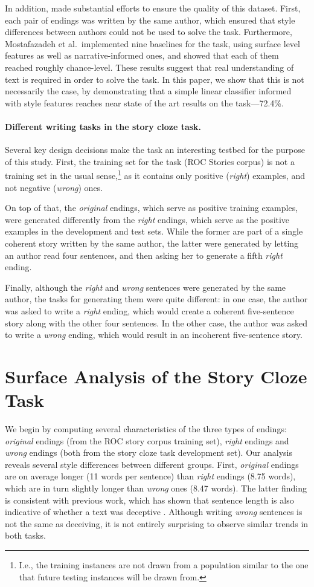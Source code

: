 \documentclass[11pt,a4paper]{article}
\newcommand{\isection}[2]{\section{#1}\label{ssec:#2}}
\begin{document}
In addition, \citet{Mostafazadeh:2016} made substantial efforts to ensure the quality of this dataset. 
First, each pair of endings was written by the same author, which
ensured that style differences between authors could not be used to solve the task. 
Furthermore, Mostafazadeh et al.~implemented nine baselines for the task, using surface level features as well as narrative-informed ones, and showed that each of them reached roughly chance-level.
These results suggest that real understanding of text is required in order to solve the task.
In this paper, we show that this is not necessarily the case, by demonstrating that a simple linear classifier informed with style features reaches near state of the art results on the task---72.4\%.

\paragraph{Different writing tasks in the story cloze task.}
Several key design decisions make the task an interesting testbed for the purpose of this study.
First, the training set for the task (ROC Stories corpus) is not a
training set in the usual sense,\footnote{I.e., the training
  instances are not drawn from a population similar to the one that future
  testing instances will be drawn from.
}  as it contains only positive ({\it right}) examples, and not negative ({\it wrong}) ones. 

On top of that, the {\it original} endings, which serve as positive training examples, were generated differently from the {\it right} endings, which serve as the positive examples in the development and test sets. 
While the former are part of a single coherent story written by the same author, the latter were generated by letting an author read four sentences, 
and then asking her to generate a fifth {\it right} ending. 

Finally, although the {\it right} and {\it wrong} sentences were generated by the same author, 
the tasks for generating them were quite different: in one case, the author was asked to write a {\it right} ending, which would create a coherent five-sentence story along with the other four sentences. In the other case, the author was asked to write a {\it wrong} ending, which would result in an incoherent five-sentence story. 

\isection{Surface Analysis of the Story Cloze Task}{Surface}
We begin by computing several characteristics of the three types of endings: {\it original} endings (from the ROC story corpus training set), {\it right} endings and {\it wrong} endings (both from the story cloze task development set).
Our analysis  reveals several style differences between different groups. 
First, {\it original} endings are on average longer (11 words per
sentence) than {\it right} endings (8.75 words), which are in turn
slightly longer than {\it wrong} ones (8.47 words). 
The latter finding is consistent with previous work, which has shown that sentence length is also indicative of whether a text was deceptive \cite{qin2004exploratory,yancheva2013automatic}. 
Although writing {\it wrong} sentences is not the same as deceiving, it is not entirely surprising to observe similar trends in both tasks.
\end{document}

